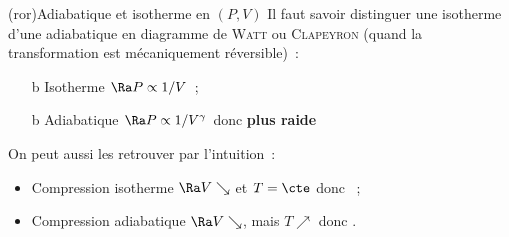 \documentclass[../../main/main.tex]{subfiles}
\begin{document}
\begin{tcb*}[list
	entry={\hspace*{-20pt}\protect\rcheck~
	Adia.\ vs.\ isoT.\ en $(P,V)$}]
	(ror){Adiabatique et isotherme en $(P,V)$}
	Il faut savoir distinguer une isotherme d'une adiabatique en diagramme
	de \textsc{Watt} ou \textsc{Clapeyron} (quand la transformation est
	mécaniquement réversible)~:
	\noindent
	\begin{minipage}[c]{.65\linewidth}
		\begin{itemize}
			\item[b]{Isotherme} $\Ra P \propto 1/V$~;
			\item[b]{Adiabatique} $\Ra P \propto 1/V^{\gamma}$ donc \textbf{plus raide}
		\end{itemize}
		On peut aussi les retrouver par l'intuition~:
		\begin{itemize}
			\item Compression isotherme $\Ra V \searrow$ et $T=\cte$ donc ~;
			\item Compression adiabatique $\Ra V \searrow$, mais $T \nearrow$ donc
			      .
		\end{itemize}
	\end{minipage}
	\hfill
	\begin{minipage}[c]{.33\linewidth}
		\begin{center}
\end{center}
\end{minipage}
\end{tcb*}
\end{document}
